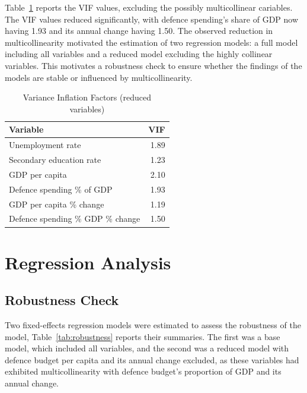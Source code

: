 Table~\ref{tab:multicollinearity_reduced} reports the VIF values, excluding the possibly multicollinear 
cariables.
The VIF values reduced significantly, with defence spending's share of GDP now having 
1.93 and its annual change having 1.50. The observed reduction in multicollinearity motivated the 
estimation of two regression models: a full model including all variables and a reduced model 
excluding the highly collinear variables. This motivates a robustness check to ensure whether 
the findings of the models are stable or influenced by multicollinearity.

\begin{table}[ht]
\caption{Variance Inflation Factors (reduced variables)}
\small
\centering
\begin{tabularx}{\textwidth}{l r}
\toprule
\textbf{Variable} & \textbf{VIF} \\
\midrule
Unemployment rate & 1.89 \\
Secondary education rate & 1.23 \\
GDP per capita & 2.10 \\
Defence spending \% of GDP & 1.93 \\
GDP per capita \% change & 1.19 \\
Defence spending \% GDP \% change & 1.50 \\
\bottomrule
\end{tabularx}
\label{tab:multicollinearity_reduced}
\end{table}

\section{Regression Analysis}

\subsection{Robustness Check}

Two fixed-effects regression models were estimated to assess the robustness of the model, 
Table~\ref{tab:robustness} reports their summaries. 
The first was a base model, 
which included all variables, and the second was a reduced model with defence budget 
per capita and its annual change excluded, as these variables had exhibited multicollinearity 
with defence budget's proportion of GDP and its annual change.

